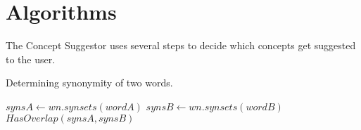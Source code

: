 \documentclass{article}
\begin{document}




\section{Algorithms}

The Concept Suggestor uses several steps to decide which concepts get suggested to the user. 

\begin{algorithm}
\caption{Determining synonymity of two words.}\label{al:synonymity}
\begin{algorithmic}[1]
		\State $\textit{synsA} \gets \textit{wn.synsets}(wordA)$
		\State $\textit{synsB} \gets \textit{wn.synsets}(wordB)$
		\State \Return $\textit{HasOverlap}(synsA, synsB)$
	\EndProcedure
\end{algorithmic}
\end{algorithm}
\end{document}
